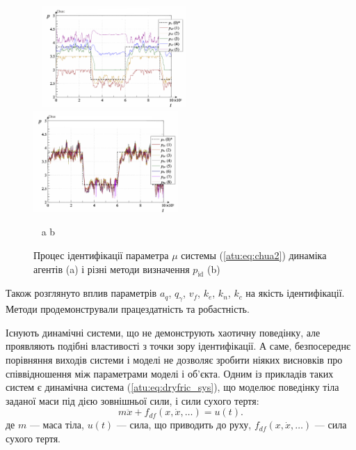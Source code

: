\documentclass[a4paper,13pt]{atuaref}
\begin{document}
\begin{figure}[htb!]
\centerline{
    ~ \hfill
    \includegraphics[width=0.49\textwidth]{p5/p/cha/chua/ql3rlWvnAAW/chua_id-p_t_pi_ql3rlWvnAAW_sign_xl.png}
    \hfill
    \includegraphics[width=0.49\textwidth]{p5/p/cha/chua/ql3rlWvnAAW/chua_id-p_t_p_ql3rlWvnAAW_sign_xl.png}
    \hfill ~
}
  \vspace{-1.5ex}
  \begin{center}
    ~ \hfill a \hfill\hfill b \hfill ~
  \end{center}
  \vspace{-2.5ex}
\caption{Процес ідентифікації параметра $\mu$ системы (\ref{atu:eq:chua2})
  динаміка агентів (a) і різні методи визначення $p_\mathrm{id}$ (b)
}
\label{atu:f:chua_id}
\end{figure}

Також розглянуто вплив параметрів $a_q$, $q_\gamma$, $v_f$, $k_e$, $k_n$, $k_c$
на якість ідентифікації. Методи
продемонстрували працездатність та робастність.


Існують динамічні системи, що не демонструють хаотичну поведінку,
але проявляють подібні властивості з точки зору ідентифікації. А саме,
безпосереднє порівняння виходів системи і моделі не дозволяє зробити ніяких
висновків про співвідношення між параметрами моделі і об'єкта. Одним із
прикладів таких систем є динамічна система (\ref{atu:eq:dryfric_sys}), що
моделює поведінку тіла заданої маси під дією зовнішньої сили, і сили
сухого тертя: %
%
\begin{equation}
  m \ddot{x} + f_{df}( x, \dot{x}, \ldots)  = u(t).
\label{atu:eq:dryfric_sys}
\end{equation}
%
де
$m$ --- маса тіла,
$u(t)$ --- сила, що приводить до руху,
$f_{df}( x, \dot{x}, \ldots)$ --- сила сухого тертя.
\end{document}
